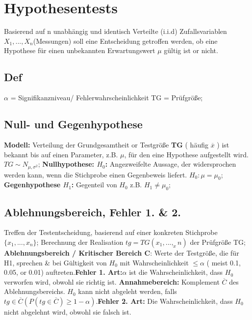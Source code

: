 \section{Hypothesentests}
Basierend auf n unabhängig und identisch Verteilte (i.i.d) Zufallsvariablen $ X_{1}, ..., X_{n} $(Messungen) soll eine Entscheidung getroffen werden, ob eine Hypothese für einen unbekannten Erwartungswert $ \mu $ gültig ist or nicht.
\subsection{Def}
$\alpha $ = Signifikanzniveau/ Fehlerwahrscheinlichkeit 
TG = Prüfgröße; 
\subsection{Null- und Gegenhypothese}
\textbf{Modell:} Verteilung der Grundgesamtheit or Testgröße \textbf{TG} ( häufig $\overline{x}$ ) ist bekannt bis auf einen Parameter, z.B. $ \mu $, für den eine Hypothese aufgestellt wird.
$ TG \sim  N_{\mu, \sigma^2}$; 
\textbf{Nullhypothese: $ H_{0}$:} Angezweifelte Aussage, der widersprochen werden kann, wenn die Stichprobe einen Gegenbeweis liefert. $ H_{0}: \mu = \mu_{0}$; 
\textbf{Gegenhypothese $ H_{1} $:} Gegenteil von $ H_{0} $ z.B. $ H_{1} \neq \mu_{0} $;
\subsection{Ablehnungsbereich, Fehler 1. \& 2.}
Treffen der Testentscheidung, basierend auf einer konkreten Stichprobe 
$ \{x_{1}, ..., x_{n} \} $; Berechnung der Realisation $ tg = TG(x_{1},..., _x{n}) $ der Prüfgröße TG; 
\textbf{Ablehnungsbereich / Kritischer Bereich C}: Werte der Testgröße, die für H1, sprechen \& bei Gültigkeit von $ H_{0} $ mit Wahrscheinlichkeit $ \le \alpha $ ( meist 0.1, 0.05, or 0.01) auftreten.\textbf{Fehler 1. Art:}$ \alpha $ ist die Wahrscheinlichkeit, dass $ H_{0} $ verworfen wird, obwohl sie richtig ist.
\textbf{Annahmebereich:} Komplement $ \overline{C} $ des Ablehnungsbereichs. $ H_{0} $ kann nicht abgeleht werden, falls $ tg \in \overline{C} (P(tg \in \overline{C}) \ge 1 - \alpha) $.\textbf{Fehler 2. Art:} Die Wahrscheinlichkeit, dass $ H_{0} $ nicht abgelehnt wird, obwohl sie falsch ist.